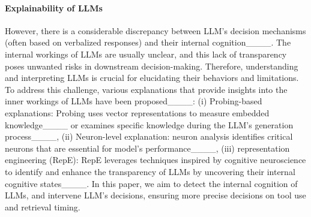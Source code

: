 \paragraph{Explainability of LLMs}
However, there is a considerable discrepancy between LLM's decision mechanisms (often based on verbalized responses) and their internal cognition____. The internal workings of LLMs are usually unclear, and this lack of transparency poses unwanted risks in downstream decision-making. Therefore, understanding and interpreting LLMs is crucial for elucidating their behaviors and limitations. To address this challenge, various explanations that provide insights into the inner workings of LLMs have been proposed____: 
(i) Probing-based explanations: Probing uses vector representations to measure embedded knowledge____ or examines specific knowledge during the LLM's generation process____, (ii) Neuron-level explanation: neuron analysis identifies critical neurons that are essential for model's performance____, (iii) representation engineering (RepE): RepE leverages techniques inspired by cognitive neuroscience to identify and enhance the transparency of LLMs by uncovering their internal cognitive states____. In this paper, we aim to detect the internal cognition of LLMs, and intervene LLM's decisions, \ie ensuring more precise decisions on tool use and retrieval timing.